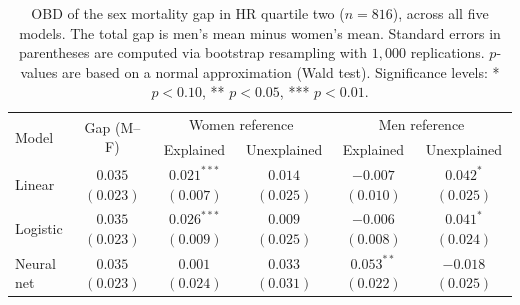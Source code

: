 \begin{table}[!ht]
    \caption{OBD of the sex mortality gap in HR quartile two ($n = 816$), across all five models. The total gap is men's mean minus women's mean. Standard errors in parentheses are computed via bootstrap resampling with $1{,}000$ replications. $p$-values are based on a normal approximation (Wald test). Significance levels: * $p<0.10$, ** $p<0.05$, *** $p<0.01$.}
    \label{tab:hrq2_bootstrap_models}
    \centering
    \scriptsize
    \begin{tabular}{@{}lc*{4}{c}@{}}
    \toprule
    \multirow{2}{*}{Model} &
    \multirow{2}{*}{Gap (M--F)} &
    \multicolumn{2}{c}{Women reference} &
    \multicolumn{2}{c}{Men reference} \\
    \cmidrule(lr){3-4} \cmidrule(lr){5-6}
    & & Explained & Unexplained & Explained & Unexplained \\
    \midrule

    Linear
        & \makecell{$0.035$ \\ $(0.023)$}
        & \makecell{$0.021^{***}$ \\ $(0.007)$}
        & \makecell{$0.014$ \\ $(0.025)$}
        & \makecell{$-0.007$ \\ $(0.010)$}
        & \makecell{$0.042^{*}$ \\ $(0.025)$} \\[0.3em]

    Logistic
        & \makecell{$0.035$ \\ $(0.023)$}
        & \makecell{$0.026^{***}$ \\ $(0.009)$}
        & \makecell{$0.009$ \\ $(0.025)$}
        & \makecell{$-0.006$ \\ $(0.008)$}
        & \makecell{$0.041^{*}$ \\ $(0.024)$} \\[0.3em]

    Neural net
        & \makecell{$0.035$ \\ $(0.023)$}
        & \makecell{$0.001$ \\ $(0.024)$}
        & \makecell{$0.033$ \\ $(0.031)$}
        & \makecell{$0.053^{**}$ \\ $(0.022)$}
        & \makecell{$-0.018$ \\ $(0.025)$} \\[0.3em]


\end{tabular}
\end{table}
